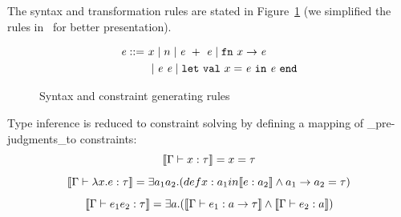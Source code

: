 % 

The syntax and transformation rules are stated in
Figure~\ref{figure:ml-constraints} (we simplified the rules
in~\cite{haack:slicing} for better presentation).

\begin{figure}
\hfil
\begin{minipage}{2.3in}
\begin{align*}
\expr ::=  & x \mid n \mid \expr  +   \expr \mid \fn  x \rightarrow \expr \\
        & \mid \expr  \expr \mid \kwlet  \val  x = \expr  \kwin 
	\expr  \kwend
\end{align*}

\end{minipage}
\hfil
\caption{Syntax and constraint generating rules}
\label{figure:ml-constraints}
\end{figure}


Type inference is reduced to constraint solving by defining a mapping
of _pre-judgments_to constraints:
\[\llbracket \Gamma \vdash x:\tau \rrbracket = x =\tau\]
\[\llbracket \Gamma \vdash \lambda x.e:\tau \rrbracket = \exists a_1 a_2.
(def x: a_1 in \llbracket e:a_2 \rrbracket \land a_1 \rightarrow a_2 =\tau)\]
\[\llbracket \Gamma\vdash e_1 e_2 : \tau \rrbracket = \exists a.(\llbracket \Gamma \vdash
e_1:a\rightarrow \tau \rrbracket\land \llbracket \Gamma\vdash e_2:a \rrbracket)\]


